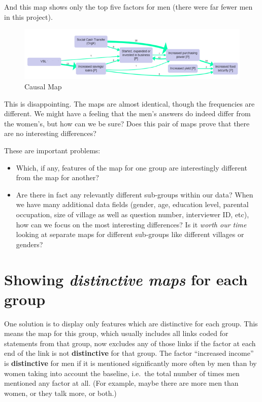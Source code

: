 \documentclass[
]{book}
\begin{document}
And this map shows only the top five factors for men (there were far fewer men in this project).

\begin{figure}
\centering
\includegraphics{_assets/men.png}
\caption{Causal Map}
\end{figure}

This is disappointing. The maps are almost identical, though the frequencies are different. We might have a feeling that the men's answers do indeed differ from the women's, but how can we be sure? Does this pair of maps prove that there are no interesting differences?

These are important problems:

\begin{itemize}
\item
  Which, if any, features of the map for one group are interestingly different from the map for another?
\item
  Are there in fact any relevantly different sub-groups within our data? When we have many additional data fields (gender, age, education level, parental occupation, size of village as well as question number, interviewer ID, etc), how can we focus on the most interesting differences? Is it \emph{worth our time} looking at separate maps for different sub-groups like different villages or genders?
\end{itemize}

\hypertarget{showing-distinctive-maps-for-each-group}{%
\section{\texorpdfstring{Showing \emph{distinctive maps} for each group}{Showing distinctive maps for each group}}\label{showing-distinctive-maps-for-each-group}}

One solution is to display only features which are distinctive for each group. This means the map for this group, which usually includes all links coded for statements from that group, now excludes any of those links if the factor at each end of the link is not \textbf{distinctive} for that group. The factor ``increased income'' is \textbf{distinctive} for men if it is mentioned significantly more often by men than by women taking into account the baseline, i.e.~the total number of times men mentioned any factor at all. (For example, maybe there are more men than women, or they talk more, or both.)
\end{document}
